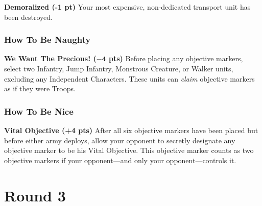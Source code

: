 \documentclass[12pt,titlepage]{article}
\newcommand{\paragraphsmall}[1]{\noindent\textbf{#1}\quad}
\begin{document}
{\vspace{6pt}
\paragraphsmall{Demoralized (-1 pt)} Your most expensive, non-dedicated transport unit has been destroyed.

\subsubsection*{How To Be Naughty}

\paragraphsmall{We Want The Precious! ($\mathbf{-4}$ pts)} Before placing any objective markers, select two Infantry, Jump Infantry, Monstrous Creature, or Walker units, excluding any Independent Characters. These units can \textit{claim} objective markers as if they were Troops.

\subsubsection*{How To Be Nice}

\paragraphsmall{Vital Objective (+4 pts)} After all six objective markers have been placed but before either army deploys, allow your opponent to secretly designate any objective marker to be his Vital Objective. This objective marker counts as two objective markers if your opponent---and only your opponent---controls it.
}

\newpage
{}
\section*{Round 3}
\vspace{-9pt}
\end{document}
